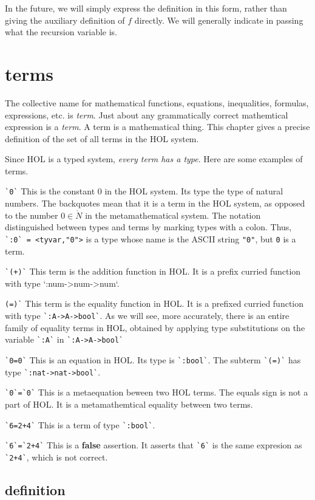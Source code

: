 \documentclass[cup9a]{cupbook}
\begin{document}
In the future, we will simply express the definition in this form, rather than giving the auxiliary definition of $f$ directly.  We will generally indicate in passing what the recursion variable is.


\chapter{terms}

The collective name for mathematical functions, equations, inequalities, formulas, expressions, etc. is {\it term}.  Just about any grammatically correct mathemtical expression is a {\it term}.  A term is a mathematical thing.  This chapter gives a precise definition of the set of all terms in the HOL system.

Since HOL is a typed system, {\it every term has a type}.
Here are some examples of terms.

\verb!`0`!  This is the constant $0$ in the HOL system.  Its type the type of natural numbers.  The backquotes mean that it is a term in the HOL system, as opposed to the number $0\in\ring{N}$ in the metamathematical system.  The notation distinguished between types and terms by marking types with a colon.  Thus, \verb!`:0` = <tyvar,"0">! is a type whose name is the ASCII string \verb!"0"!, but \verb`0` is a term.

\verb!`(+)`!  This term is the addition function in HOL.  It is a prefix curried function with type `:num->num->num`.

\verb!(=)`!  This term is the equality function in HOL.  It is a prefixed curried function with type \verb!`:A->A->bool`!.  As we will see, more accurately, there is an entire family of equality terms in HOL, obtained by applying type substitutions on the variable \verb!`:A`! in \verb!`:A->A->bool`!

\verb!`0=0`!  This is an equation in HOL.  Its type is \verb!`:bool`!.  The subterm \verb!`(=)`! has type \verb!`:nat->nat->bool`!.

\verb!`0`=`0`!  This is a metaequation beween two HOL terms.  The equals sign is not a part of HOL.  It is a metamathemtical equality between two terms.

\verb!`6=2+4`!  This is a term of type \verb!`:bool`!.

\verb!`6`=`2+4`!  This is a {\bf false} assertion.  It asserts that \verb!`6`! is the same expresion as \verb!`2+4`!, which is not correct.  

\section{definition}
\end{document}

